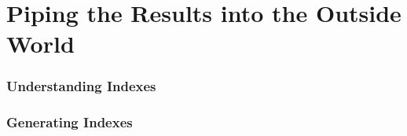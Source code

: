 \documentclass[hyperref={pdfpagelabels=true}]{beamer}
\begin{document}
\section{Piping the Results into the Outside World} 


\begin{frame}
\frametitle{Understanding Indexes}
\end{frame}

\begin{frame}
\frametitle{Generating Indexes}
\end{frame}
\end{document}
